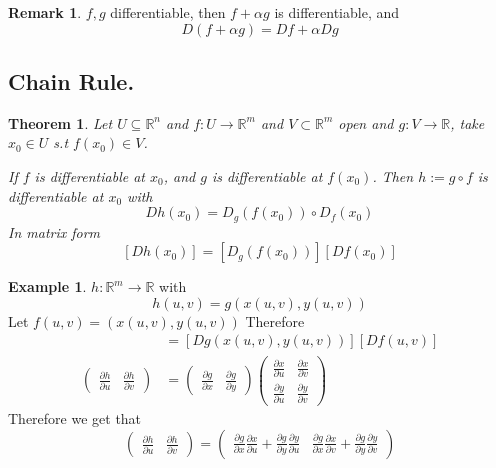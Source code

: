 \documentclass[11pt,a4paper]{article}
\theoremstyle{definition}
\newtheorem{example}[definition]{Example}
\newtheorem{remark}[definition]{Remark}
\theoremstyle{plain}
\newtheorem{theorem}[definition]{Theorem}
\theoremstyle{remark}
\newcommand{\R}{\mathbb{R}}
\begin{document}
\begin{remark}
    $f,g$ differentiable, then $f + \alpha g$ is differentiable, and 
    $$D(f + \alpha g) = Df + \alpha Dg$$    
\end{remark}

\subsection{Chain Rule.} 
\begin{theorem}
    Let $U \subseteq \R^n$ and $f \colon U \to \R^m$ and $V \subset \R^m$ open and $g \colon V \to \R$, 
    take $x_0 \in U$ s.t $f(x_0) \in V$. 

    If $f$ is differentiable at $x_0$, and $g$ is differentiable at $f(x_0)$. Then $h := g \circ f$ is differentiable at $x_0$ with 
    $$Dh(x_0) = D_g(f(x_0)) \circ D_f(x_0)$$
    In matrix form 
    $$[Dh(x_0)] = [D_g(f(x_0))] [Df(x_0)]$$
\end{theorem}

\begin{example}
    $h \colon \R^m \to \R$ with 
    $$h(u,v) = g(x(u,v), y(u,v))$$
    Let $f (u,v) = (x(u,v),y(u,v))$ Therefore 
    \begin{align*}
        [Dh(u,v)] &= [Dg(x(u,v), y(u,v))]  [Df(u,v)] \\
        \begin{pmatrix}
            \frac{\partial h}{\partial u} & \frac{\partial h}{\partial v}
        \end{pmatrix} &= \begin{pmatrix}
            \frac{\partial g}{\partial x} & \frac{\partial g}{\partial y}
        \end{pmatrix} \begin{pmatrix}
            \frac{\partial x}{\partial u} & \frac{\partial x}{\partial v} \\
            \frac{\partial y}{\partial u} & \frac{\partial y}{\partial v}
        \end{pmatrix}
    \end{align*}
    Therefore we get that 
    $$\begin{pmatrix}
            \frac{\partial h}{\partial u} & \frac{\partial h}{\partial v}
        \end{pmatrix} = \begin{pmatrix}
            \frac{\partial g}{\partial x} \frac{\partial x}{\partial u} + \frac{\partial g}{\partial y} \frac{\partial y}{\partial u} & 
            \frac{\partial g}{\partial x} \frac{\partial x}{\partial v} + \frac{\partial g}{\partial y} \frac{\partial y}{\partial v}
        \end{pmatrix}$$
\end{example}
\end{document}
